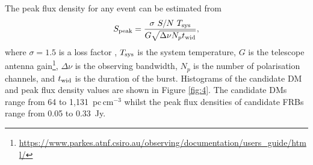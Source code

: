 \documentclass[fleqn,usenatbib]{mnras}
\begin{document}

The peak flux density for any event can be estimated from
\begin{equation}
    S_{\rm peak}=\frac{\sigma \  S/N \ T_{\rm sys}}{G \sqrt{\Delta \nu  N_p t_{\rm wid}}},
	\label{eq:slim}
\end{equation}
where $\sigma=1.5$ is a loss factor \citep{Manchester2001}, $T_{\rm sys}$ is the system temperature, $G$ is the telescope antenna gain\footnote{\url{https://www.parkes.atnf.csiro.au/observing/documentation/users\_guide/html/}}, $\Delta \nu$ is the observing bandwidth, $N_p$ is the number of polarisation channels, and $t_{\rm wid}$ is the duration of the burst.
%
Histograms of the candidate DM and peak flux density values are shown in Figure \ref{fig:4}. The candidate DMs range from 64 to 1,131~pc\,cm$^{-3}$ whilst the peak flux densities of candidate FRBs range from 0.05 to 0.33~Jy. 
\end{document}
